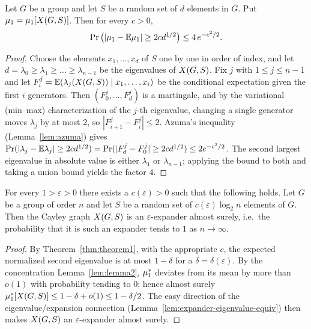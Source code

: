 
\begin{lemma}
  \label{lem:lemma2}
  Let $G$ be a group and let $S$ be a random set of $d$ elements in $G$. Put
  $\mu_{1} = \mu_{1}[X(G,S)]$. Then for every $c > 0$,
  \[
    \operatorname{Pr}\big(|\mu_{1} - \mathbb{E}\mu_{1}| \ge 2cd^{1/2}\big) \le 4\,e^{-c^2/2}.
  \]
\end{lemma}
\begin{proof}
  Choose the elements $x_1, \dots, x_d$ of $S$ one by one in order of index, and
  let $d = \lambda_0 \ge \lambda_1 \ge \dots \ge \lambda_{n-1}$ be the
  eigenvalues of $X(G,S)$. Fix $j$ with $1 \le j \le n-1$ and let
  $F_i^{j} = \mathbb{E}(\lambda_j(X(G,S)) \mid x_1, \dots, x_i)$ be the conditional
  expectation given the first $i$ generators. Then $(F_0^{j}, \dots, F_d^{j})$ is
  a martingale, and by the variational (min--max) characterization of the $j$-th
  eigenvalue, changing a single generator moves $\lambda_j$ by at most $2$, so
  $|F_{i+1}^{j} - F_i^{j}| \le 2$. Azuma's inequality
  (Lemma~\ref{lem:azuma}) gives
  $\operatorname{Pr}(|\lambda_j - \mathbb{E}\lambda_j| \ge 2cd^{1/2}) =
   \operatorname{Pr}(|F_d^{j} - F_0^{j}| \ge 2cd^{1/2}) \le 2e^{-c^2/2}$.
  The second largest eigenvalue in absolute value is either $\lambda_1$ or
  $\lambda_{n-1}$; applying the bound to both and taking a union bound yields
  the factor $4$.
\end{proof}

\begin{corollary}
  \label{cor:corollary1}
  For every $1 > \varepsilon > 0$ there exists a $c(\varepsilon) > 0$ such that
  the following holds. Let $G$ be a group of order $n$ and let $S$ be a random
  set of $c(\varepsilon)\log_2 n$ elements of $G$. Then the Cayley graph
  $X(G,S)$ is an $\varepsilon$-expander almost surely, i.e.\ the probability
  that it is such an expander tends to $1$ as $n \to \infty$.
\end{corollary}
\begin{proof}
  By Theorem~\ref{thm:theorem1}, with the appropriate $c$, the expected
  normalized second eigenvalue is at most $1 - \delta$ for a $\delta = \delta(
  \varepsilon)$. By the concentration Lemma~\ref{lem:lemma2}, $\mu_{1}^{*}$ deviates
  from its mean by more than $o(1)$ with probability tending to $0$; hence almost
  surely $\mu_{1}^{*}[X(G,S)] \le 1 - \delta + o(1) \le 1 - \delta/2$. The easy
  direction of the eigenvalue/expansion connection
  (Lemma~\ref{lem:expander-eigenvalue-equiv}) then makes $X(G,S)$ an
  $\varepsilon$-expander almost surely.
\end{proof}

